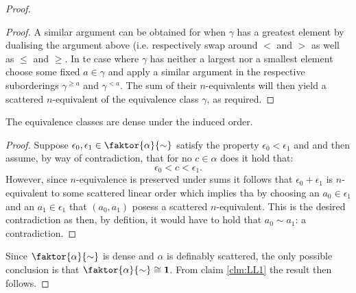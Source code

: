 \begin{proof}
\begin{proof}
		A similar argument can be obtained for when $\gamma$ has a greatest element by dualising the argument above (i.e. respectively swap around $<$ and $>$ as well as $\leq$ and $\geq$.  In te case where $\gamma$ has neither a largest nor a smallest element choose some fixed $a\in\gamma$ and apply a similar argument in the respective suborderings $\gamma^{\geq a}$ and $\gamma^{<a}$.  The sum of their $n$-equivalents will then yield a scattered $n$-equivalent of the equivalence class $\gamma$, as required.\noqed
	\end{proof}

	\begin{claim}
		The equivalence classes are dense under the induced order.
	\end{claim}
	\begin{proof}
		Suppose $\epsilon_0,\epsilon_1\in\faktor{\alpha}{\sim}$ satisfy the property $\epsilon_0<\epsilon_1$ and and then assume, by way of contradiction, that for no $c\in\alpha$ does it hold that:
		\begin{equation}
			\epsilon_0<c<\epsilon_1.
		\end{equation}
		However, since $n$-equivalence is preserved under sums it follows that $\epsilon_0+\epsilon_1$ is $n$-equivalent to some scattered linear order which implies tha by choosing an $a_0\in\epsilon_1$ and an $a_1\in\epsilon_1$ that $(a_0,a_1)$ posess a scattered $n$-equivalent.  This is the desired contradiction as then, by defition, it would have to hold that $a_0\sim a_1$: a contradiction.\noqed
	\end{proof}
	Since $\faktor{\alpha}{\sim}$ is dense and $\alpha$ is definably scattered, the only possible conclusion is that $\faktor{\alpha}{\sim}\cong\one$.  From claim \ref{clm:LL1} the result then follows.
\end{proof}

